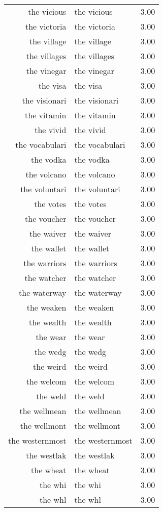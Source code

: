 \begin{table}[ht]
\begin{tabular}{rlr}
  the vicious & the vicious & 3.00 \\ 
  the victoria & the victoria & 3.00 \\ 
  the village & the village & 3.00 \\ 
  the villages & the villages & 3.00 \\ 
  the vinegar & the vinegar & 3.00 \\ 
  the visa & the visa & 3.00 \\ 
  the visionari & the visionari & 3.00 \\ 
  the vitamin & the vitamin & 3.00 \\ 
  the vivid & the vivid & 3.00 \\ 
  the vocabulari & the vocabulari & 3.00 \\ 
  the vodka & the vodka & 3.00 \\ 
  the volcano & the volcano & 3.00 \\ 
  the voluntari & the voluntari & 3.00 \\ 
  the votes & the votes & 3.00 \\ 
  the voucher & the voucher & 3.00 \\ 
  the waiver & the waiver & 3.00 \\ 
  the wallet & the wallet & 3.00 \\ 
  the warriors & the warriors & 3.00 \\ 
  the watcher & the watcher & 3.00 \\ 
  the waterway & the waterway & 3.00 \\ 
  the weaken & the weaken & 3.00 \\ 
  the wealth & the wealth & 3.00 \\ 
  the wear & the wear & 3.00 \\ 
  the wedg & the wedg & 3.00 \\ 
  the weird & the weird & 3.00 \\ 
  the welcom & the welcom & 3.00 \\ 
  the weld & the weld & 3.00 \\ 
  the wellmean & the wellmean & 3.00 \\ 
  the wellmont & the wellmont & 3.00 \\ 
  the westernmost & the westernmost & 3.00 \\ 
  the westlak & the westlak & 3.00 \\ 
  the wheat & the wheat & 3.00 \\ 
  the whi & the whi & 3.00 \\ 
  the whl & the whl & 3.00 \\ 

\end{tabular}
\end{table}
